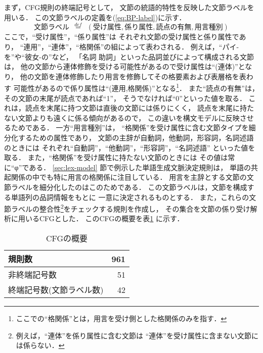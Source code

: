 まず，CFG規則の終端記号として，
文節の統語的特性を反映した文節ラベルを用いる．
この文節ラベルの定義を(\ref{eq:BP-label})に示す．
\begin{equation}
  \label{eq:BP-label}
  文節ラベル ~~\stackrel{def}{=}~~
  (受け属性,係り属性,読点の有無,用言種別)
\end{equation}
ここで，``受け属性''，``係り属性''は
それぞれ文節の受け属性と係り属性であり，
``連用''，``連体''，``格関係''の組によって表わされる．
例えば，``パイ-を''や``彼女-の''など，
「名詞 助詞」といった品詞並びによって構成される文節は，
他の文節から連体修飾を受ける可能性があるので受け属性は``(連体)''となり，
他の文節を連体修飾したり用言を修飾してその格要素および表層格を表わす
可能性があるので係り属性は``(連用,格関係)''となる\footnote{
  ここでの``格関係''とは，用言を受け側とした格関係のみを指す．
  }．
また``読点の有無''は，その文節の末尾が読点であれば``1''，
そうでなければ``0''といった値を取る．
これは，読点を末尾に持つ文節は直後の文節には係りにくく，
読点を末尾に持たない文節よりも遠くに係る傾向があるので，
この違いを構文モデルに反映させるためである．
一方``用言種別''は，
``格関係''を受け属性に含む文節タイプを細分化するための属性であり，
文節の主辞が自動詞，他動詞，形容詞，名詞述語のときには
それぞれ``自動詞''，``他動詞''，``形容詞''，``名詞述語''
といった値を取る．
また，``格関係''を受け属性に持たない文節のときには
その値は常に``φ''である．
\ref{sec:lex-model} 節で例示した単語生成文脈決定規則は，
単語の共起関係の中でも特に用言の格関係に注目している．
用言を主辞とする文節の文節ラベルを細分化したのはこのためである．
この文節ラベルは，文節を構成する単語列の品詞情報をもとに
一意に決定されるものとする．
また，これらの文節ラベルの整合性\footnote{
  例えば，``連体''を係り属性に含む文節は
  ``連体''を受け属性に含まない文節には係らない．
  }をチェックする規則を作成し，
その集合を文節の係り受け解析に用いるCFGとした．
このCFGの概要を表\ref{tab:grammar} に示す．
\begin{table}[htbp]
  \begin{center}
    \caption{CFGの概要}
    \label{tab:grammar}

    \begin{tabular}{|l|r|}  \hline
      規則数       & 961 \\ \hline
      非終端記号数 &  51 \\ \hline
      終端記号数(文節ラベル数) &  42 \\ \hline
    \end{tabular}
  \end{center}
\end{table}

